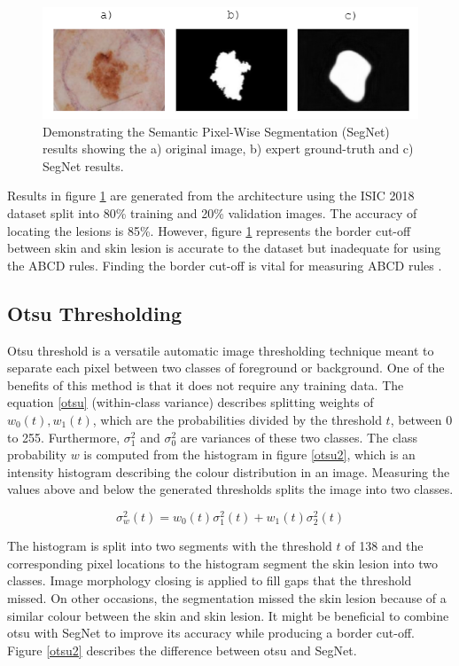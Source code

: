 \documentclass[10.5pt]{report}
\begin{document}
\begin{figure}[hb]
\centering
\includegraphics[scale=1.2]{border-seg.png}
\caption{Demonstrating the Semantic Pixel-Wise Segmentation (SegNet) results showing the a) original image, b) expert ground-truth and c) SegNet results.} \label{SegNet}
\end{figure}

Results in figure \ref{SegNet} are generated from the architecture using the ISIC 2018 dataset split into 80\% training and 20\% validation images. The accuracy of locating the lesions is 85\%. However, figure \ref{SegNet} represents the border cut-off between skin and skin lesion is accurate to the dataset but inadequate for using the ABCD rules. Finding the border cut-off is vital for measuring ABCD rules \cite{Pereira2020}.

\subsection{Otsu Thresholding}
Otsu threshold is a versatile automatic image thresholding technique meant to separate each pixel between two classes of foreground or background. One of the benefits of this method is that it does not require any training data. The equation \ref{otsu} (within-class variance) describes splitting weights of $w_0(t),w_1(t)$, which are the probabilities divided by the threshold $t$, between 0 to 255. Furthermore, $\sigma_1^2$ and $\sigma_0^2$ are variances of these two classes. The class probability $w$ is computed from the histogram in figure \ref{otsu2}, which is an intensity histogram describing the colour distribution in an image. Measuring the values above and below the generated thresholds splits the image into two classes.

\begin{equation} \label{otsu}
\sigma_w^2(t) = w_0(t)\sigma_1^2(t) + w_1(t)\sigma_2^2(t)
\end{equation}

The histogram is split into two segments with the threshold $t$ of 138 and the corresponding pixel locations to the histogram segment the skin lesion into two classes. Image morphology closing is applied to fill gaps that the threshold missed. On other occasions, the segmentation missed the skin lesion because of a similar colour between the skin and skin lesion. It might be beneficial to combine otsu with SegNet to improve its accuracy while producing a border cut-off. Figure \ref{otsu2} describes the difference between otsu and SegNet.
\end{document}
